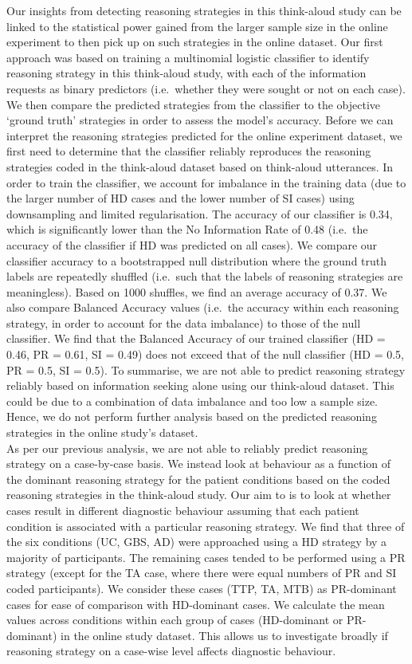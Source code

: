 \documentclass[a4paper, nobind]{templates/ociamthesis}
\begin{document}
Our insights from detecting reasoning strategies in this think-aloud study can be linked to the statistical power gained from the larger sample size in the online experiment to then pick up on such strategies in the online dataset. Our first approach was based on training a multinomial logistic classifier to identify reasoning strategy in this think-aloud study, with each of the information requests as binary predictors (i.e.~whether they were sought or not on each case). We then compare the predicted strategies from the classifier to the objective `ground truth' strategies in order to assess the model's accuracy. Before we can interpret the reasoning strategies predicted for the online experiment dataset, we first need to determine that the classifier reliably reproduces the reasoning strategies coded in the think-aloud dataset based on think-aloud utterances. In order to train the classifier, we account for imbalance in the training data (due to the larger number of HD cases and the lower number of SI cases) using downsampling and limited regularisation. The accuracy of our classifier is 0.34, which is significantly lower than the No Information Rate of 0.48 (i.e.~the accuracy of the classifier if HD was predicted on all cases). We compare our classifier accuracy to a bootstrapped null distribution where the ground truth labels are repeatedly shuffled (i.e.~such that the labels of reasoning strategies are meaningless). Based on 1000 shuffles, we find an average accuracy of 0.37. We also compare Balanced Accuracy values (i.e.~the accuracy within each reasoning strategy, in order to account for the data imbalance) to those of the null classifier. We find that the Balanced Accuracy of our trained classifier (HD = 0.46, PR = 0.61, SI = 0.49) does not exceed that of the null classifier (HD = 0.5, PR = 0.5, SI = 0.5). To summarise, we are not able to predict reasoning strategy reliably based on information seeking alone using our think-aloud dataset. This could be due to a combination of data imbalance and too low a sample size. Hence, we do not perform further analysis based on the predicted reasoning strategies in the online study's dataset.\\

As per our previous analysis, we are not able to reliably predict reasoning strategy on a case-by-case basis. We instead look at behaviour as a function of the dominant reasoning strategy for the patient conditions based on the coded reasoning strategies in the think-aloud study. Our aim to is to look at whether cases result in different diagnostic behaviour assuming that each patient condition is associated with a particular reasoning strategy. We find that three of the six conditions (UC, GBS, AD) were approached using a HD strategy by a majority of participants. The remaining cases tended to be performed using a PR strategy (except for the TA case, where there were equal numbers of PR and SI coded participants). We consider these cases (TTP, TA, MTB) as PR-dominant cases for ease of comparison with HD-dominant cases. We calculate the mean values across conditions within each group of cases (HD-dominant or PR-dominant) in the online study dataset. This allows us to investigate broadly if reasoning strategy on a case-wise level affects diagnostic behaviour.
\end{document}
